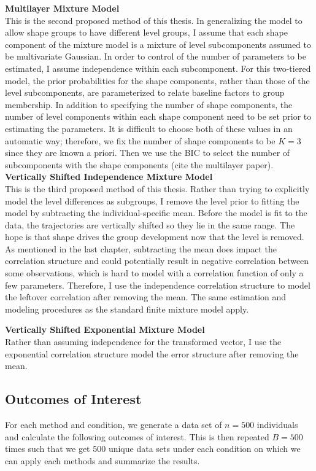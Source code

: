 \textbf{Multilayer Mixture Model}\\
This is the second proposed method of this thesis. In generalizing the model to allow shape groups to have different level groups, I assume that each shape component of the mixture model is a mixture of level subcomponents assumed to be multivariate Gaussian. In order to control of the number of parameters to be estimated, I assume independence within each subcomponent. For this two-tiered model, the prior probabilities for the shape components, rather than those of the level subcomponents, are parameterized to relate baseline factors to group membership. In addition to specifying the number of shape components, the number of level components within each shape component need to be set prior to estimating the parameters. It is difficult to choose both of these values in an automatic way; therefore, we fix the number of shape components to be $K=3$ since they are known a priori. Then we use the BIC to select the number of subcomponents with the shape components (cite the multilayer paper). \\

\textbf{Vertically Shifted Independence Mixture Model}\\
This is the third proposed method of this thesis. Rather than trying to explicitly model the level differences as subgroups, I remove the level prior to fitting the model by subtracting the individual-specific mean. Before the model is fit to the data, the trajectories are vertically shifted so they lie in the same range. The hope is that shape drives the group development now that the level is removed. As mentioned in the last chapter, subtracting the mean does impact the correlation structure and could potentially result in negative correlation between some observations, which is hard to model with a correlation function of only a few parameters. Therefore, I use the independence correlation structure to model the leftover correlation after removing the mean. The same estimation and modeling procedures as the standard finite mixture model apply.

\textbf{Vertically Shifted Exponential Mixture Model}\\
Rather than assuming independence for the transformed vector, I use the exponential correlation structure model the error structure after removing the mean.

\subsection{Outcomes of Interest}
For each method and condition, we generate a data set of $n=500$ individuals and calculate the following outcomes of interest. This is then repeated $B=500$ times such that we get 500 unique data sets under each condition on which we can apply each methods and summarize the results.\\

